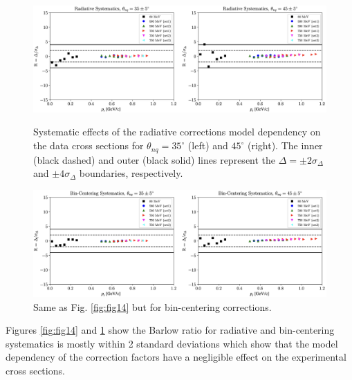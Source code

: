 \documentclass[aps, prl]{revtex4-2}  %
\begin{document}
\begin{figure}[!h]
\includegraphics[scale=0.33]{plots/rad_sys.png}
\caption{Systematic effects of the radiative corrections model dependency on the data cross sections for $\theta_{nq}=35^{\circ}$ (left) and $45^{\circ}$ (right). The inner (black dashed) and outer (black solid) lines represent the $\Delta=\pm2\sigma_{\Delta}$ and $\pm4\sigma_{\Delta}$ boundaries, respectively.  }
\label{fig:fig14}
\includegraphics[scale=0.33]{plots/bc_sys.png}
\caption{Same as Fig. \ref{fig:fig14} but for bin-centering corrections.}
\label{fig:fig15}
\end{figure}
\clearpage
Figures \ref{fig:fig14} and \ref{fig:fig15} show the Barlow ratio for radiative and bin-centering systematics is mostly within 2 standard deviations which show that
the model dependency of the correction factors have a negligible effect on the experimental cross sections.
\end{document}
